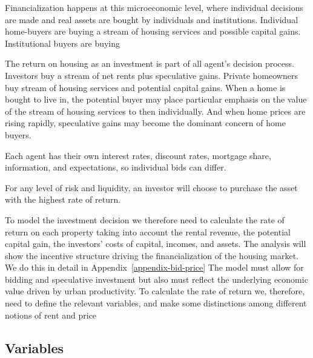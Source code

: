 
Financialization happens at this microeconomic level, where individual decisions are made and real assets are bought by individuals and institutions. Individual home-buyers are buying a stream of housing services and possible capital gains. Institutional buyers are buying 




The return on housing as an investment is part of all agent's decision process. 
Investors buy a stream of net rents plus speculative gains. 
Private homeowners buy stream of housing services and potential capital gains. When a home is bought to live in, the potential buyer %
may place particular emphasis on the value of the stream of housing services to then individually. And when home prices are rising rapidly, speculative gains may become the dominant concern of home buyers. 

Each agent has their own interest rates, discount rates, mortgage share, information, and expectations, so individual bids can differ. 

For any level of risk and liquidity, an investor will choose to purchase the asset with the highest rate of return. 


To model the investment decision  we therefore need to calculate the \gls{rate of return} on each property taking into account the rental revenue, the potential capital gain, the investors' costs of capital, incomes, and assets. The analysis will show the incentive structure driving the  financialization of the housing market. We do this in detail in Appendix~\ref{appendix-bid-price} 
The model must  allow for bidding and speculative investment but also must reflect the underlying economic value driven by urban productivity. To calculate the \gls{rate of return} we, therefore, need to define  the relevant variables, and make some distinctions among different notions  of rent and price %
\subsection {Variables}


